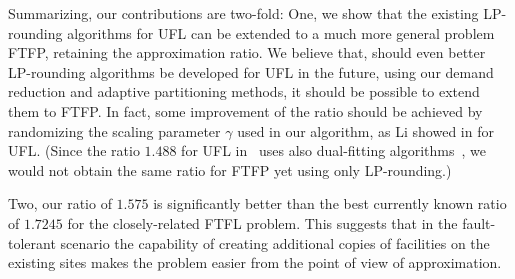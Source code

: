 Summarizing, our contributions are two-fold: One, we show
that the existing LP-rounding algorithms for UFL can be
extended to a much more general problem FTFP, retaining the
approximation ratio. We believe that, should even better
LP-rounding algorithms be developed for UFL in the future,
using our demand reduction and adaptive partitioning
methods, it should be possible to extend them to FTFP.
In fact, some improvement of the ratio
should be achieved by randomizing the scaling parameter
$\gamma$ used in our algorithm, as Li showed in \cite{Li11}
for UFL.  (Since the ratio $1.488$ for UFL in~\cite{Li11}
uses also dual-fitting
algorithms~\cite{MahdianYZ06}, we would not obtain the same
ratio for FTFP yet using only LP-rounding.)

Two, our ratio of $1.575$ is significantly better than the
best currently known ratio of $1.7245$ for the
closely-related FTFL problem. This suggests that in the
fault-tolerant scenario the capability of creating
additional copies of facilities on the existing sites makes
the problem easier from the point of view of approximation.
